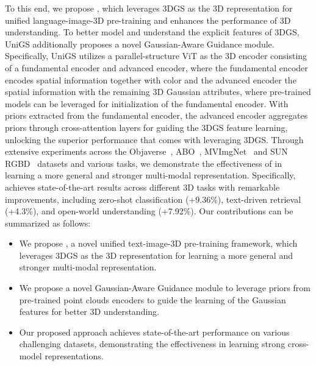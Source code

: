 To this end, we propose \name{}, which leverages 3DGS as the 3D representation for unified language-image-3D pre-training and enhances the performance of 3D understanding. 
To better model and understand the explicit features of 3DGS,
UniGS additionally proposes a novel Gaussian-Aware Guidance module. 
Specifically, UniGS utilizes a parallel-structure ViT as the 3D encoder consisting of a fundamental encoder and advanced encoder, where the fundamental encoder encodes spatial information together with color and the advanced encoder the spatial information with the remaining 3D Gaussian attributes, where pre-trained models can be leveraged for initialization of the fundamental encoder.
With priors extracted from the fundamental encoder, the advanced encoder aggregates priors through cross-attention layers for guiding the 3DGS feature learning, unlocking the superior performance that comes with leveraging 3DGS.
%
Through extensive experiments across the Objaverse~\citep{deitke2023objaverse}, ABO~\citep{collins2022abo}, MVImgNet~\citep{yu2023mvimgnet} and SUN RGBD~\citep{song2015sun} datasets and various tasks, we demonstrate the effectiveness of \name{} in learning a more general and stronger multi-modal representation.
%
Specifically, \name{} achieves state-of-the-art results across different 3D tasks with remarkable improvements, including zero-shot classification (+9.36\%), text-driven retrieval (+4.3\%), and open-world understanding (+7.92\%).
Our contributions can be summarized as follows: 
\begin{itemize}
    \item We propose \name{}, a novel unified text-image-3D pre-training framework, which leverages 3DGS as the 3D representation for learning a more general and stronger multi-modal representation.
    \item We propose a novel Gaussian-Aware Guidance module to leverage priors from pre-trained point clouds encoders to guide the learning of the Gaussian features for better 3D understanding.
    \item Our proposed approach achieves state-of-the-art performance on various challenging datasets, demonstrating the effectiveness in learning strong cross-model representations.
\end{itemize}
